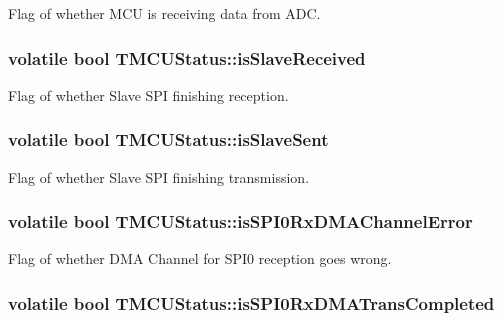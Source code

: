 Flag of whether M\-C\-U is receiving data from A\-D\-C. \hypertarget{struct_t_m_c_u_status_a93f9e6a2964b9b5d7c8c31ee7f3b418a}{
\subsubsection[{is\-Slave\-Received}]{\setlength{\rightskip}{0pt plus 5cm}volatile bool T\-M\-C\-U\-Status\-::is\-Slave\-Received}}\label{struct_t_m_c_u_status_a93f9e6a2964b9b5d7c8c31ee7f3b418a}
Flag of whether Slave S\-P\-I finishing reception. \hypertarget{struct_t_m_c_u_status_ad09ebfde33e68b109909147dc08b55fd}{
\subsubsection[{is\-Slave\-Sent}]{\setlength{\rightskip}{0pt plus 5cm}volatile bool T\-M\-C\-U\-Status\-::is\-Slave\-Sent}}\label{struct_t_m_c_u_status_ad09ebfde33e68b109909147dc08b55fd}
Flag of whether Slave S\-P\-I finishing transmission. \hypertarget{struct_t_m_c_u_status_aba5065fea6beb711f6d8ab94af52d98d}{
\subsubsection[{is\-S\-P\-I0\-Rx\-D\-M\-A\-Channel\-Error}]{\setlength{\rightskip}{0pt plus 5cm}volatile bool T\-M\-C\-U\-Status\-::is\-S\-P\-I0\-Rx\-D\-M\-A\-Channel\-Error}}\label{struct_t_m_c_u_status_aba5065fea6beb711f6d8ab94af52d98d}
Flag of whether D\-M\-A Channel for S\-P\-I0 reception goes wrong. \hypertarget{struct_t_m_c_u_status_ae8571f5d7f20af8bfaa6cfdf05146599}{
\subsubsection[{is\-S\-P\-I0\-Rx\-D\-M\-A\-Trans\-Completed}]{\setlength{\rightskip}{0pt plus 5cm}volatile bool T\-M\-C\-U\-Status\-::is\-S\-P\-I0\-Rx\-D\-M\-A\-Trans\-Completed}}\label{struct_t_m_c_u_status_ae8571f5d7f20af8bfaa6cfdf05146599}
